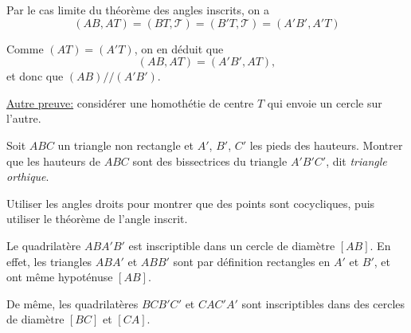 \begin{exo}
\begin{sol}
Par le cas limite du théorème des angles inscrits, on a 
\[ (AB,AT) = (BT,\mathcal T)=(B'T,\mathcal T)=(A'B',A'T)\]

Comme $(AT) = (A'T)$, on en déduit que
\[ (AB,AT) = (A'B',AT),\]
et donc que $(AB)//(A'B')$. 

\underline{Autre preuve:} considérer une homothétie de centre $T$ qui envoie un cercle sur l'autre.

\end{sol}
\end{exo}



\begin{exo}%
Soit $ABC$ un triangle non rectangle et $A'$, $B'$, $C'$ les pieds des hauteurs. Montrer que les hauteurs de $ABC$ sont des bissectrices du triangle $A'B'C'$, dit \emph{triangle orthique}. 

\begin{hint}   
Utiliser les angles droits pour montrer que des points sont cocycliques, puis utiliser le théorème de l'angle inscrit.
\end{hint}      
\begin{sol}

Le quadrilatère $ABA'B'$ est inscriptible dans un cercle de diamètre $[AB]$. En effet, les triangles $ABA'$ et $ABB'$ sont par définition rectangles en $A'$ et $B'$, et ont même hypoténuse $[AB]$.

De même, les quadrilatères $BCB'C'$ et $CAC'A'$ sont inscriptibles dans des cercles de diamètre $[BC]$ et $[CA]$.

\begin{center}


\end{center}
\end{sol}
\end{exo}
